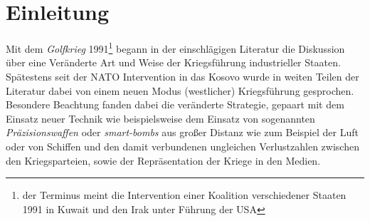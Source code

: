 \documentclass[11pt,a4paper,oneside,numbers=noenddot,bibliography=totocnumbered,DIV=13]{scrartcl}
\begin{document}
\section{Einleitung}
Mit dem \textit{Golfkrieg} 1991\footnote{der Terminus meint die Intervention einer Koalition verschiedener Staaten 1991 in Kuwait und den Irak unter Führung der USA} begann in der einschlägigen Literatur die Diskussion über eine Veränderte Art und Weise der Kriegsführung industrieller Staaten. Spätestens seit der NATO Intervention in das Kosovo wurde in weiten Teilen der Literatur dabei von einem neuen Modus (westlicher) Kriegsführung gesprochen. Besondere Beachtung fanden dabei die veränderte Strategie, gepaart mit dem Einsatz neuer Technik wie beispielsweise dem Einsatz von sogenannten \textit{Präzisionswaffen} oder \textit{smart-bombs} aus großer Distanz wie zum Beispiel der Luft oder von Schiffen und den damit verbundenen ungleichen Verlustzahlen zwischen den Kriegsparteien, sowie der Repräsentation der Kriege in den Medien. 
%

\newpage
\end{document}
